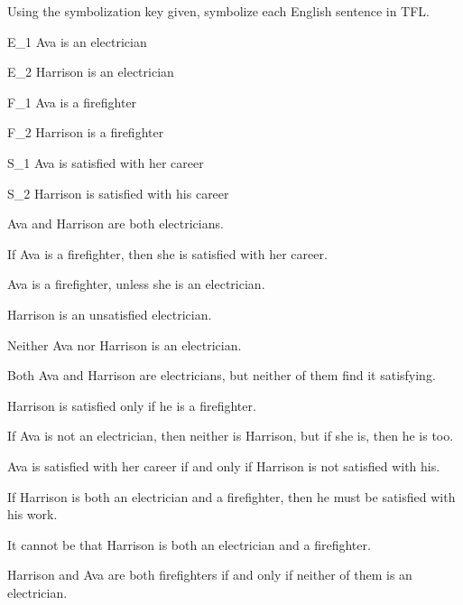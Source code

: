 \solutions

\problempart Using the symbolization key given, symbolize each English sentence in TFL.\label{pr.avacareer}
	\begin{ekey}
		\item[E_1] Ava is an electrician
		\item[E_2] Harrison is an electrician
		\item[F_1] Ava is a firefighter
		\item[F_2] Harrison is a firefighter
		\item[S_1] Ava is satisfied with her career
		\item[S_2] Harrison is satisfied with his career
	\end{ekey}
\begin{compactlist}
\item Ava and Harrison are both electricians.
\item[] 
\item If Ava is a firefighter, then she is satisfied with her career.
\item[] 
\item Ava is a firefighter, unless she is an electrician.
\item[] 
\item Harrison is an unsatisfied electrician.
\item[] 
\item Neither Ava nor Harrison is an electrician.
\item[] 
\item Both Ava and Harrison are electricians, but neither of them find it satisfying.
\item[] 
\item Harrison is satisfied only if he is a firefighter.
\item[] 
\item If Ava is not an electrician, then neither is Harrison, but if she is, then he is too.
\item[] 
\item Ava is satisfied with her career if and only if Harrison is not satisfied with his.
\item[] 
\item If Harrison is both an electrician and a firefighter, then he must be satisfied with his work.
\item[] 
\item It cannot be that Harrison is both an electrician and a firefighter.
\item[] 
\item Harrison and Ava are both firefighters if and only if neither of them is an electrician.
\item[] 
\end{compactlist}

